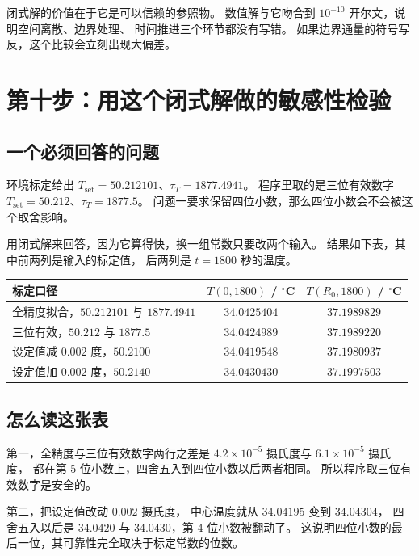 \begin{keypoint}
闭式解的价值在于它是可以信赖的参照物。
数值解与它吻合到 $10^{-10}$ 开尔文，说明空间离散、边界处理、
时间推进三个环节都没有写错。
如果边界通量的符号写反，这个比较会立刻出现大偏差。
\end{keypoint}

\section{第十步：用这个闭式解做的敏感性检验}

\subsection{一个必须回答的问题}

环境标定给出 $T_{\mathrm{set}}=50.212101$、$\tau_T=1877.4941$。
程序里取的是三位有效数字 $T_{\mathrm{set}}=50.212$、$\tau_T=1877.5$。
问题一要求保留四位小数，那么四位小数会不会被这个取舍影响。

用闭式解来回答，因为它算得快，换一组常数只要改两个输入。
结果如下表，其中前两列是输入的标定值，
后两列是 $t=1800$ 秒的温度。

\begin{center}
\begin{tabular}{@{}lcc@{}}
\toprule
标定口径 & $T(0,1800)$ / $^\circ$C & $T(R_0,1800)$ / $^\circ$C \\
\midrule
全精度拟合，$50.212101$ 与 $1877.4941$ & $34.0425404$ & $37.1989829$ \\
三位有效，$50.212$ 与 $1877.5$ & $34.0424989$ & $37.1989220$ \\
设定值减 $0.002$ 度，$50.2100$ & $34.0419548$ & $37.1980937$ \\
设定值加 $0.002$ 度，$50.2140$ & $34.0430430$ & $37.1997503$ \\
\bottomrule
\end{tabular}
\end{center}

\subsection{怎么读这张表}

第一，全精度与三位有效数字两行之差是
$4.2\times10^{-5}$ 摄氏度与 $6.1\times10^{-5}$ 摄氏度，
都在第 5 位小数上，四舍五入到四位小数以后两者相同。
所以程序取三位有效数字是安全的。

第二，把设定值改动 $0.002$ 摄氏度，
中心温度就从 $34.04195$ 变到 $34.04304$，
四舍五入以后是 $34.0420$ 与 $34.0430$，第 4 位小数被翻动了。
这说明四位小数的最后一位，其可靠性完全取决于标定常数的位数。

